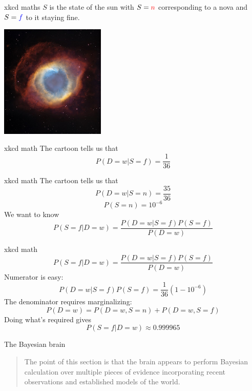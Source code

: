 \documentclass{beamer}
\newcommand{\crish}{\color{reddish}}
\newcommand{\cbla}{\color{black}}
\newcommand{\cred}{\color{red}}
\newcommand{\cblu}{\color{blue}}
\begin{document}
\begin{frame}{xkcd maths}
  \crish$S$\cbla{} is the state of the \color{orange}sun\cbla{} with
  \crish$S=\cred{}n$\cbla{}  corresponding to a \cred{}nova\cbla{} and \crish$S=\cblu{}f$\cbla{} to it staying fine. 
\begin{center}
\includegraphics[width=5cm]{nebula.jpg}
\end{center}
\vfill
{}
\end{frame}


\begin{frame}{xkcd math}
    The cartoon tells us that
  \crish$$
  P(D=w|S=f)=\frac{1}{36}
  $$\cbla{}
  \end{frame}


\begin{frame}{xkcd math}
  The cartoon tells us that
  \crish$$
  P(D=w|S=n)=\frac{35}{36}
  $$\cbla{}
\crish$$
P(S=n)=10^{-6}
$$\cbla{}
We want to know
\crish$$
P(S=f|D=w)=\frac{P(D=w|S=f)P(S=f)}{P(D=w)}
$$\cbla{}
\end{frame}


\begin{frame}{xkcd math}
\crish$$
P(S=f|D=w)=\frac{P(D=w|S=f)P(S=f)}{P(D=w)}
$$\cbla{}
Numerator is easy:
\crish$$
P(D=w|S=f)P(S=f)=\frac{1}{36}(1-10^{-6})
$$\cbla{}
The denominator requires marginalizing:
\crish$$
P(D=w)=P(D=w,S=n)+P(D=w,S=f)
$$\cbla{}
\vskip 1cm
Doing what's required gives
\crish$$
P(S=f|D=w)\approx 0.999965
$$\cbla{}
\end{frame}

\begin{frame}{The Bayesian brain}
  \begin{quote}The point of this section is that the brain appears to perform Bayesian calculation over multiple pieces of evidence incorporating recent observations and established models of the world.
  \end{quote}
\end{frame}
\end{document}

